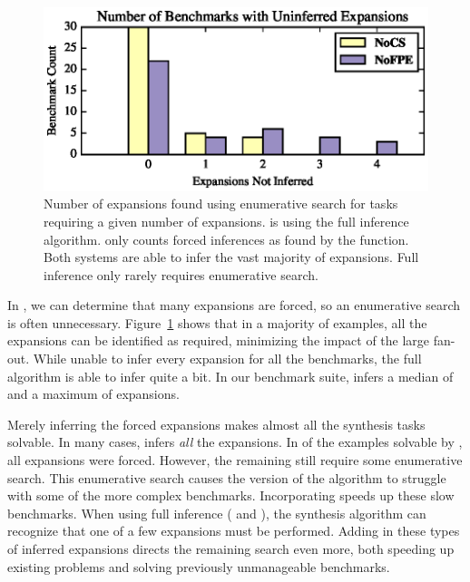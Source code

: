 \documentclass[sigplan,acmsmall]{acmart}
\begin{document}
\begin{figure}
  \includegraphics{generated-graphs/uninferred}
  \caption{Number of expansions found using enumerative search for tasks
    requiring a given number of
    expansions.  \NoCSMode{} is using the full inference
  algorithm.
    \NoFPEMode{} only counts forced inferences as found by
  the \ExpandRequired{} function.  Both systems are able
    to infer the vast majority of expansions. Full inference only rarely
    requires enumerative search.}
  \label{fig:uninferred-exps}
\end{figure}

In \NoFPEMode{}, we can determine that many expansions are forced, so 
an enumerative search is often unnecessary.
Figure~\ref{fig:uninferred-exps} shows that in a majority of examples, all the
expansions can be identified as required, minimizing the impact of the
large fan-out.  While unable to infer every expansion for all the benchmarks,
the full algorithm is able to infer quite a bit.
In our benchmark suite, \ExpandRequired{} infers a median of \MedianExpansionsForcedNoLC
and a maximum of \MaxExpansionsForcedNoLC expansions.

Merely inferring the forced expansions makes almost all the synthesis tasks
solvable.  In many cases, \NoFPEMode{} infers
\emph{all} the expansions.  In \ExpansionsAllForcedNoLC{} of the
\BenchmarksCompletedNoLC{} examples 
solvable by \NoCSMode{}, all expansions
were forced.  However, the remaining \ExpansionsNotAllForcedNoLC{} still require
some enumerative search.
This enumerative search causes the \NoFPEMode{} version of the algorithm to
struggle with some of the more complex benchmarks.
Incorporating \FixProblemElts{} speeds up these slow benchmarks.  When
using full inference (\FixProblemElts{} and \ExpandRequired), the synthesis
algorithm can 
recognize that one of a few expansions must be performed.  Adding in these types of
inferred expansions directs the remaining search even more, both speeding up
existing problems and solving previously unmanageable benchmarks.
\end{document}
